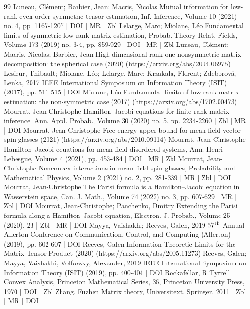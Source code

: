 \begin{thebibliography}{99}
Luneau, Clément; Barbier, Jean; Macris, Nicolas Mutual information for low-rank even-order symmetric tensor estimation, Inf. Inference, Volume 10 (2021) no. 4, pp. 1167-1207 | DOI | MR | Zbl
Lelarge, Marc; Miolane, Léo Fundamental limits of symmetric low-rank matrix estimation, Probab. Theory Relat. Fields, Volume 173 (2019) no. 3-4, pp. 859-929 | DOI | MR | Zbl
Luneau, Clément; Macris, Nicolas; Barbier, Jean High-dimensional rank-one nonsymmetric matrix decomposition: the spherical case (2020) (https://arxiv.org/abs/2004.06975)
Lesieur, Thibault; Miolane, Léo; Lelarge, Marc; Krzakala, Florent; Zdeborová, Lenka, 2017 IEEE International Symposium on Information Theory (ISIT) (2017), pp. 511-515 | DOI
Miolane, Léo Fundamental limits of low-rank matrix estimation: the non-symmetric case (2017) (https://arxiv.org/abs/1702.00473)
Mourrat, Jean-Christophe Hamilton–Jacobi equations for finite-rank matrix inference, Ann. Appl. Probab., Volume 30 (2020) no. 5, pp. 2234-2260 | Zbl | MR | DOI
Mourrat, Jean-Christophe Free energy upper bound for mean-field vector spin glasses (2021) (https://arxiv.org/abs/2010.09114)
Mourrat, Jean-Christophe Hamilton–Jacobi equations for mean-field disordered systems, Ann. Henri Lebesgue, Volume 4 (2021), pp. 453-484 | DOI | MR | Zbl
Mourrat, Jean-Christophe Nonconvex interactions in mean-field spin glasses, Probability and Mathematical Physics, Volume 2 (2021) no. 2, pp. 281-339 | MR | Zbl | DOI
Mourrat, Jean-Christophe The Parisi formula is a Hamilton–Jacobi equation in Wasserstein space, Can. J. Math., Volume 74 (2022) no. 3, pp. 607-629 | MR | Zbl | DOI
Mourrat, Jean-Christophe; Panchenko, Dmitry Extending the Parisi formula along a Hamilton–Jacobi equation, Electron. J. Probab., Volume 25 (2020), 23 | Zbl | MR | DOI
Mayya, Vaishakhi; Reeves, Galen, 2019 $57^{\rm th}$ Annual Allerton Conference on Communication, Control, and Computing (Allerton) (2019), pp. 602-607 | DOI
Reeves, Galen Information-Theoretic Limits for the Matrix Tensor Product (2020) (https://arxiv.org/abs/2005.11273)
Reeves, Galen; Mayya, Vaishakhi; Volfovsky, Alexander, 2019 IEEE International Symposium on Information Theory (ISIT) (2019), pp. 400-404 | DOI
Rockafellar, R Tyrrell Convex Analysis, Princeton Mathematical Series, 36, Princeton University Press, 1970 | DOI | Zbl
Zhang, Fuzhen Matrix theory, Universitext, Springer, 2011 | Zbl | MR | DOI
\end{thebibliography}
